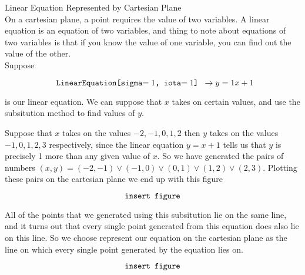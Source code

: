 \documentclass{book}
\begin{document}
  {\remark Linear Equation Represented by Cartesian Plane \\
    On a cartesian plane, a point requires the value of two variables. A linear equation is an equation of two variables, and thing to note about equations of two variables is that if you know the value of one variable, you can find out the value of the other.\\

    Suppose

    $$\text{\texttt{ LinearEquation[sigma$= {1}$, iota$= {1}$] }}\to y = {1}x + {1}$$

    is our linear equation. We can suppose that $x$ takes on certain values, and use the subsitution method to find values of $y$.

    Suppose that $x$ takes on the values $-2, -1, 0, 1, 2$ then $y$ takes on the values $-1, 0, 1, 2, 3$ respectively, since the linear equation $y = x + 1$ tells us that $y$ is precisely 1 more than any given value of $x$. So we have generated the pairs of numbers $(x, y) = (-2, -1) \lor (-1, 0) \lor (0, 1) \lor (1, 2) \lor (2, 3)$. Plotting these pairs on the cartesian plane we end up with this figure

    $$\text{\texttt{insert figure}}$$

    All of the points that we generated using this subsitution lie on the same line, and it turns out that every single point generated from this equation does also lie on this line. So we choose represent our equation on the cartesian plane as the line on which every single point generated by the equation lies on.

    $$\text{\texttt{insert figure}}$$
  }
\end{document}
